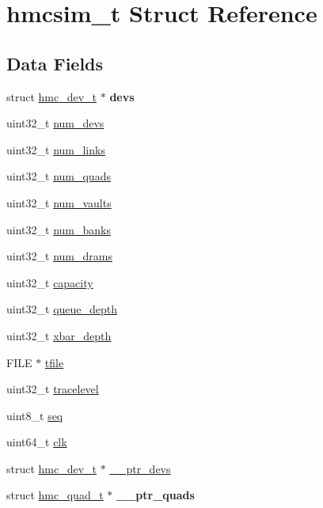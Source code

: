 \hypertarget{structhmcsim__t}{\section{hmcsim\-\_\-t Struct Reference}
\label{structhmcsim__t}
}
\subsection*{Data Fields}
\begin{DoxyCompactItemize}
\item 
\hypertarget{structhmcsim__t_ab9a3966aeabbbad413871979d4694235}{struct \hyperlink{structhmc__dev__t}{hmc\-\_\-dev\-\_\-t} $\ast$ {\bfseries devs}}\label{structhmcsim__t_ab9a3966aeabbbad413871979d4694235}

\item 
uint32\-\_\-t \hyperlink{structhmcsim__t_aa11e7edf3811b43bcb5e624d2b83dbf6}{num\-\_\-devs}
\item 
uint32\-\_\-t \hyperlink{structhmcsim__t_ad248f0930675a283bdcf821a68703dc3}{num\-\_\-links}
\item 
uint32\-\_\-t \hyperlink{structhmcsim__t_a39422582c1c7e0a3b0787b5209887329}{num\-\_\-quads}
\item 
uint32\-\_\-t \hyperlink{structhmcsim__t_a66fb8d5d598a7fbceefaad3dd96ec6e0}{num\-\_\-vaults}
\item 
uint32\-\_\-t \hyperlink{structhmcsim__t_aeb143d0d648144e4daa22d96e395da5c}{num\-\_\-banks}
\item 
uint32\-\_\-t \hyperlink{structhmcsim__t_a8243c603f7ab323024fd6342c6f856de}{num\-\_\-drams}
\item 
uint32\-\_\-t \hyperlink{structhmcsim__t_a9471a6617d601750cdbd6db48487a66f}{capacity}
\item 
uint32\-\_\-t \hyperlink{structhmcsim__t_a30a69481d824b545c762af1a870a9ec1}{queue\-\_\-depth}
\item 
uint32\-\_\-t \hyperlink{structhmcsim__t_a9ee666483d49753bf9432eb42fab73eb}{xbar\-\_\-depth}
\item 
F\-I\-L\-E $\ast$ \hyperlink{structhmcsim__t_a95541b8744b316387f4eaa026f405e97}{tfile}
\item 
uint32\-\_\-t \hyperlink{structhmcsim__t_a538d618819d1aea568265c4573673265}{tracelevel}
\item 
uint8\-\_\-t \hyperlink{structhmcsim__t_a88d9cee2bbc19b8d4b650a9562090366}{seq}
\item 
uint64\-\_\-t \hyperlink{structhmcsim__t_afbe3d57099fff20f474d2303fdd599cc}{clk}
\item 
struct \hyperlink{structhmc__dev__t}{hmc\-\_\-dev\-\_\-t} $\ast$ \hyperlink{structhmcsim__t_a53692f7358387116e3f506142d5c2029}{\-\_\-\-\_\-ptr\-\_\-devs}
\item 
\hypertarget{structhmcsim__t_a29b50f27d4b8dce64cf8745f924c5d92}{struct \hyperlink{structhmc__quad__t}{hmc\-\_\-quad\-\_\-t} $\ast$ {\bfseries \-\_\-\-\_\-ptr\-\_\-quads}}\label{structhmcsim__t_a29b50f27d4b8dce64cf8745f924c5d92}


\end{DoxyCompactItemize}
